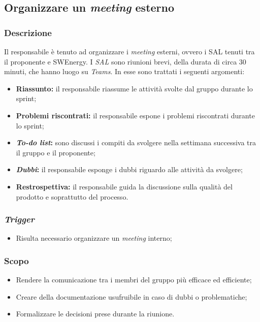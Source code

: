 \subsection{Organizzare un \textit{meeting} esterno}
\label{organizzare-meeting-esterno}

\subsubsection{Descrizione}
Il responsabile è tenuto ad organizzare i \textit{meeting} esterni, ovvero i SAL
tenuti tra il proponente e SWEnergy.
I \textit{SAL} sono riunioni brevi, della durata di circa 30 minuti, che hanno
luogo su \textit{Teams}. In esse
sono trattati i seguenti argomenti:
\begin{itemize}
	\item \textbf{Riassunto:} il responsabile riassume le attività svolte dal
	      gruppo durante lo sprint;

	\item \textbf{Problemi riscontrati:} il responsabile espone i problemi
	      riscontrati durante lo sprint;

	\item \textbf{\textit{To-do list}:} sono discussi i compiti da svolgere nella
	      settimana successiva tra il gruppo e il proponente;

	\item \textbf{\textit{Dubbi}:} il responsabile esponge i dubbi riguardo alle
	      attività da svolgere;

	\item \textbf{Restrospettiva:} il responsabile guida la discussione sulla
	      qualità del prodotto e soprattutto del processo.
\end{itemize}

\subsubsection{\textit{Trigger}}
\begin{itemize}
	\item Risulta necessario organizzare un \textit{meeting} interno;
\end{itemize}

\subsubsection{Scopo}
\begin{itemize}
	\item Rendere la comunicazione tra i membri del gruppo più efficace ed
	      efficiente;

	\item Creare della documentazione usufruibile in caso di dubbi o
	      problematiche;

	\item Formalizzare le decisioni prese durante la riunione.
\end{itemize}

